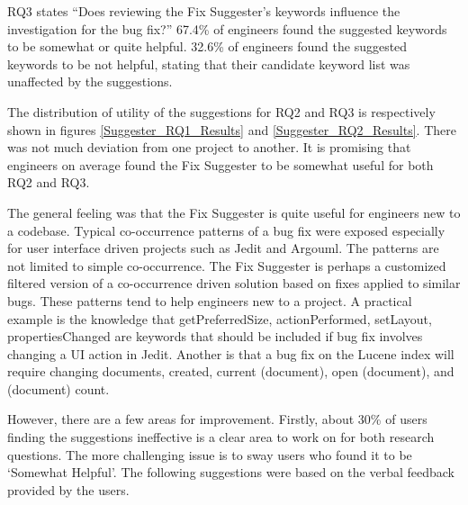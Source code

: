 \documentclass[10pt, conference, letterpaper, compsocconf]{IEEEtran}
\begin{document}
RQ3 states ``Does reviewing the Fix Suggester's keywords influence the investigation for the bug fix?'' 67.4\% of engineers found the suggested keywords to be somewhat or quite helpful. 32.6\% of engineers found the suggested keywords to be not helpful, stating that their candidate keyword list was unaffected by the suggestions.

The distribution of utility of the suggestions for RQ2 and RQ3 is respectively shown in figures \ref{Suggester_RQ1_Results} and \ref{Suggester_RQ2_Results}. There was not much deviation from one project to another. It is promising that engineers on average found the Fix Suggester to be somewhat useful for both RQ2 and RQ3.

The general feeling was that the Fix Suggester is quite useful for engineers new to a codebase. Typical co-occurrence patterns of a bug fix were exposed especially for user interface driven projects such as Jedit and Argouml. The patterns are not limited to simple co-occurrence. The Fix Suggester is perhaps a customized filtered version of a co-occurrence driven solution based on fixes applied to similar bugs. These patterns tend to help engineers new to a project. A practical example is the knowledge that getPreferredSize, actionPerformed, setLayout, propertiesChanged are keywords that should be included if bug fix involves changing a UI action in Jedit. Another is that a bug fix on the Lucene index will require changing documents, created, current (document), open (document), and (document) count.

However, there are a few areas for improvement. Firstly, about 30\% of users finding the suggestions ineffective is a clear area to work on for both research questions. The more challenging issue is to sway users who found it to be `Somewhat Helpful'. The following suggestions were based on the verbal feedback provided by the users. 
\end{document}
